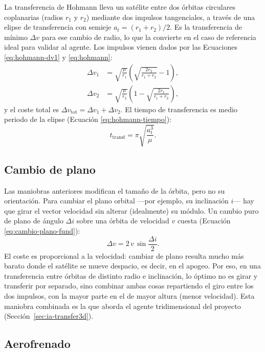 La transferencia de Hohmann lleva un satélite entre dos órbitas circulares coplanarias (radios $r_1$ y $r_2$) mediante dos impulsos tangenciales, a través de una elipse de transferencia con semieje $a_t = (r_1+r_2)/2$. Es la transferencia de mínimo $\Delta v$ para ese cambio de radio, lo que la convierte en el caso de referencia ideal para validar al agente. Los impulsos vienen dados por las Ecuaciones \ref{eq:hohmann-dv1} y \ref{eq:hohmann}:
\begin{align}
  \Delta v_1 &= \sqrt{\frac{\mu}{r_1}}\left(\sqrt{\frac{2 r_2}{r_1+r_2}} - 1\right),
  \label{eq:hohmann-dv1}\\
  \Delta v_2 &= \sqrt{\frac{\mu}{r_2}}\left(1 - \sqrt{\frac{2 r_1}{r_1+r_2}}\right),
  \label{eq:hohmann}
\end{align}
y el coste total es $\Delta v_{\text{tot}} = \Delta v_1 + \Delta v_2$. El tiempo de transferencia es medio periodo de la elipse (Ecuación \ref{eq:hohmann-tiempo}):
\begin{equation}
  t_{\text{transf}} = \pi\sqrt{\frac{a_t^{3}}{\mu}}.
  \label{eq:hohmann-tiempo}
\end{equation}

\subsection{Cambio de plano}
\label{sec:cambio-plano}

Las maniobras anteriores modifican el tamaño de la órbita, pero no su orientación. Para cambiar el plano orbital ---por ejemplo, su inclinación $i$--- hay que girar el vector velocidad sin alterar (idealmente) su módulo. Un cambio puro de plano de ángulo $\Delta i$ sobre una órbita de velocidad $v$ cuesta (Ecuación \ref{eq:cambio-plano-fund}):
\begin{equation}
  \Delta v = 2\,v\,\sin\frac{\Delta i}{2}.
  \label{eq:cambio-plano-fund}
\end{equation}
El coste es proporcional a la velocidad: cambiar de plano resulta mucho más barato donde el satélite se mueve despacio, es decir, en el apogeo. Por eso, en una transferencia entre órbitas de distinto radio e inclinación, lo óptimo no es girar y transferir por separado, sino combinar ambas cosas repartiendo el giro entre los dos impulsos, con la mayor parte en el de mayor altura (menor velocidad). Esta maniobra combinada es la que aborda el agente tridimensional del proyecto (Sección~\ref{sec:ia-transfer3d}).

\subsection{Aerofrenado}
\label{sec:aerofrenado-fund}

